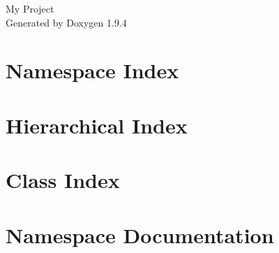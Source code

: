 \documentclass[twoside]{book}
\newcommand{\+}{\discretionary{\mbox{\scriptsize$\hookleftarrow$}}{}{}}
\newcommand{\clearemptydoublepage}{%
    \newpage{\pagestyle{empty}\cleardoublepage}%
  }
\begin{document}
  \raggedbottom
    \hypersetup{pageanchor=false,
                bookmarksnumbered=true,
                pdfencoding=unicode
               }
  \begin{titlepage}
  \vspace*{7cm}
  \begin{center}%
  {\Large My Project}\\
  \vspace*{1cm}
  {\large Generated by Doxygen 1.9.4}\\
  \end{center}
  \end{titlepage}
  \clearemptydoublepage
  \tableofcontents
  \clearemptydoublepage
  \hypersetup{pageanchor=true}
\chapter{Namespace Index}

\chapter{Hierarchical Index}

\chapter{Class Index}

\chapter{Namespace Documentation}



\end{document}
